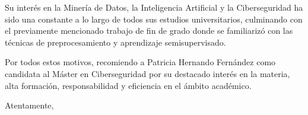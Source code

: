 \documentclass[11pt,a4paper]{letter} %
\begin{document}
\begin{letter}
Su interés en la Minería de Datos, la Inteligencia Artificial y la Ciberseguridad ha sido una constante a lo largo de todos sus estudios universitarios, culminando con el previamente mencionado trabajo de fin de grado donde se familiarizó con las técnicas de preprocesamiento y aprendizaje semisupervisado.

Por todos estos motivos, recomiendo a Patricia Hernando Fernández como candidata al Máster en Ciberseguridad por su destacado interés en la materia, alta formación, responsabilidad y eficiencia en el ámbito académico.


\closing{Atentamente,}


\end{letter}
\end{document}
